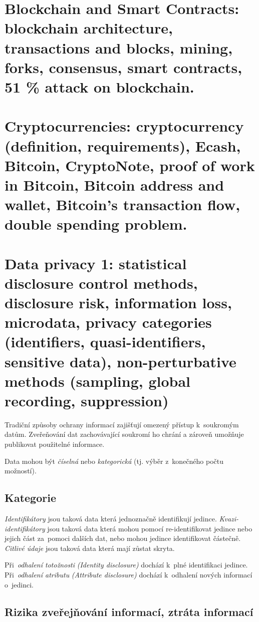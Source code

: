 \clearpage
\section{Blockchain and Smart Contracts: blockchain architecture, transactions and blocks, mining, forks, consensus, smart contracts, 51 \% attack on blockchain.}

\clearpage
\section{Cryptocurrencies: cryptocurrency (definition, requirements), Ecash, Bitcoin, CryptoNote, proof of work in Bitcoin, Bitcoin address and wallet, Bitcoin’s transaction flow, double spending problem.}



\clearpage
\section{Data privacy 1: statistical disclosure control methods, disclosure risk, information loss, microdata, privacy categories (identifiers, quasi-identifiers, sensitive data), non-perturbative methods (sampling, global recording, suppression)}

Tradiční způsoby ochrany informací zajišťují omezený přístup k~soukromým datům.
Zveřeňování dat zachovávající soukromí ho chrání a zároveň umožňuje publikovat použitelné informace.

Data mohou být \emph{číselná} nebo \emph{kategorická} (tj. výběr z~konečného počtu možností).


\subsection{Kategorie}

\emph{Identifikátory} jsou taková data která jednoznačně identifikují jedince.
\emph{Kvazi-identifikátory} jsou taková data která mohou pomocí re-identifikovat jedince nebo jejich část za~pomoci dalších dat, nebo mohou jedince identifikovat částečně.
\emph{Citlivé údaje} jsou taková data která mají zůstat skryta.

Při~\emph{odhalení totožnosti} \emph{(Identity disclosure)} dochází k~plné identifikaci jedince.
Při~\emph{odhalení atributu} \emph{(Attribute disclosure)} dochází k~odhalení nových informací o~jedinci.


\subsection{Rizika zveřejňování informací, ztráta informací}

